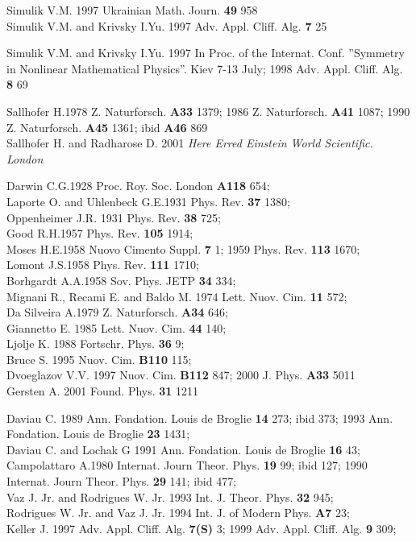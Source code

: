 \documentclass[a4paper,12pt]{article}
\begin{document}
\begin{thebibliography}{99}
  Simulik V.M. 1997 Ukrainian Math. Journ. \textbf{49} 958\\ %
Simulik V.M. and Krivsky I.Yu. 1997 Adv. Appl. Cliff. Alg. \textbf{7} 25

  Simulik V.M. and Krivsky I.Yu. 1997 In Proc. of the Internat.
Conf. ''Symmetry in Nonlinear Mathematical Physics''. Kiev 7-13 July; 1998
Adv. Appl. Cliff. Alg. \textbf{8} 69

  Sallhofer H.1978 Z. Naturforsch. \textbf{A33} 1379; 1986 Z.
Naturforsch. \textbf{A41} 1087; 1990 Z. Naturforsch. \textbf{A45} 1361; ibid
\textbf{A46} 869\\ Sallhofer H. and Radharose D. 2001 \textit{Here Erred
Einstein World Scientific. London}

  Darwin C.G.1928 Proc. Roy. Soc. London \textbf{A118} 654;\\ %
Laporte O. and Uhlenbeck G.E.1931 Phys. Rev. \textbf{37} 1380;\\ Oppenheimer
J.R. 1931 Phys. Rev. \textbf{38} 725;\\ Good R.H.1957 Phys. Rev. \textbf{105}
1914;\\ Moses H.E.1958 Nuovo Cimento Suppl. \textbf{7} 1; 1959 Phys. Rev.
\textbf{113} 1670;\\ Lomont J.S.1958 Phys. Rev. \textbf{111} 1710;\\ %
Borhgardt A.A.1958 Sov. Phys. JETP \textbf{34} 334;\\ Mignani R., Recami E.
and Baldo M. 1974 Lett. Nuov. Cim. \textbf{11} 572;\\ Da Silveira A.1979 Z.
Naturforsch. \textbf{A34} 646;\\ Giannetto E. 1985 Lett. Nuov. Cim. \textbf{%
44} 140;\\ Ljolje K. 1988 Fortschr. Phys. \textbf{36} 9;\\ Bruce S. 1995
Nuov. Cim. \textbf{B110} 115;\\ Dvoeglazov V.V. 1997 Nuov. Cim. \textbf{B112}
847; 2000 J. Phys. \textbf{A33} 5011\\ Gersten A. 2001 Found. Phys. \textbf{%
31} 1211

  Daviau C. 1989 Ann. Fondation. Louis de Broglie \textbf{14}
273; ibid 373; 1993 Ann. Fondation. Louis de Broglie \textbf{23} 1431;\\ %
Daviau C. and Lochak G 1991 Ann. Fondation. Louis de Broglie \textbf{16} 43;%
\\ Campolattaro A.1980 Internat. Journ Theor. Phys. \textbf{19} 99; ibid
127; 1990 Internat. Journ Theor. Phys. \textbf{29} 141; ibid 477;\\ Vaz J.
Jr. and Rodrigues W. Jr. 1993 Int. J. Theor. Phys. \textbf{32} 945;\\ %
Rodrigues W. Jr. and Vaz J. Jr. 1994 Int. J. of Modern Phys. \textbf{A7 }23;%
\\ Keller J. 1997 Adv. Appl. Cliff. Alg. \textbf{7(S)} 3; 1999 Adv. Appl.
Cliff. Alg. \textbf{9} 309;


\end{thebibliography}
\end{document}
